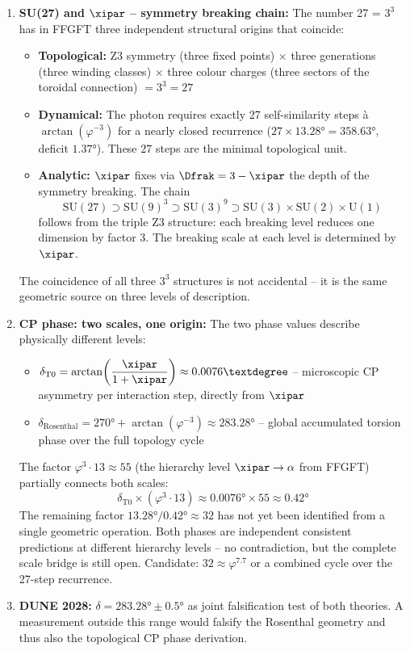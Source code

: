 \begin{enumerate}
  \item \textbf{SU(27) and $\xipar$ -- symmetry breaking chain:}
  The number 27 = $3^3$ has in FFGFT three independent structural origins that coincide:
  \begin{itemize}[noitemsep]
    \item \textbf{Topological:} Z3 symmetry (three fixed points) $\times$ three generations (three winding classes) $\times$ three colour charges (three sectors of the toroidal connection) $= 3^3 = 27$
    \item \textbf{Dynamical:} The photon requires exactly 27 self-similarity steps à $\arctan(\varphi^{-3})$ for a nearly closed recurrence ($27 \times 13.28° = 358.63°$, deficit $1.37°$). These 27 steps are the minimal topological unit.
    \item \textbf{Analytic:} $\xipar$ fixes via $\Dfrak = 3 - \xipar$ the depth of the symmetry breaking. The chain
    \[
      \mathrm{SU}(27) \supset \mathrm{SU}(9)^3 \supset \mathrm{SU}(3)^9 \supset \mathrm{SU}(3) \times \mathrm{SU}(2) \times \mathrm{U}(1)
    \]
    follows from the triple Z3 structure: each breaking level reduces one dimension by factor 3. The breaking scale at each level is determined by $\xipar$.
  \end{itemize}
  The coincidence of all three $3^3$ structures is not accidental -- it is the same geometric source on three levels of description.

  \item \textbf{CP phase: two scales, one origin:}
  The two phase values describe physically different levels:
  \begin{itemize}[noitemsep]
    \item $\delta_{\text{T0}} = \arctan\!\left(\dfrac{\xipar}{1+\xipar}\right) \approx 0.0076°$ -- microscopic CP asymmetry per interaction step, directly from $\xipar$
    \item $\delta_{\text{Rosenthal}} = 270° + \arctan(\varphi^{-3}) \approx 283.28°$ -- global accumulated torsion phase over the full topology cycle
  \end{itemize}

  The factor $\varphi^3 \cdot 13 \approx 55$ (the hierarchy level $\xipar \to \alpha$ from FFGFT) partially connects both scales:
  \[
    \delta_{\text{T0}} \times (\varphi^3 \cdot 13) \approx 0.0076° \times 55 \approx 0.42°
  \]
  The remaining factor $13.28° / 0.42° \approx 32$ has not yet been identified from a single geometric operation. Both phases are independent consistent predictions at different hierarchy levels -- no contradiction, but the complete scale bridge is still open. Candidate: $32 \approx \varphi^{7.7}$ or a combined cycle over the 27-step recurrence.

  \item \textbf{DUNE 2028:} $\delta = 283.28° \pm 0.5°$ as joint falsification test of both theories. A measurement outside this range would falsify the Rosenthal geometry and thus also the topological CP phase derivation.

\end{enumerate}

